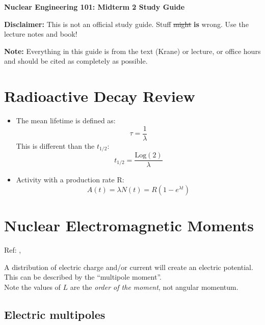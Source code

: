 \documentclass[letter]{article}
\begin{document}
\textbf{\Large{Nuclear Engineering 101: Midterm 2 Study Guide}} \\
\vspace{12pt}

\textbf{Disclaimer:} This is not an official study guide. Stuff \sout{might}
\textbf{is} wrong. Use the lecture notes and book!
\vspace{10pt}

\textbf{Note:} Everything in this guide is from the text (Krane) or
lecture, or office hours and should be cited as completely as
possible.

\tableofcontents

\section{Radioactive Decay Review}

\begin{itemize}
\item The mean lifetime is defined as:
  \begin{equation*}
    \tau = \frac{1}{\lambda}
  \end{equation*}
This is different than the $t_{1/2}$:
\begin{equation*}
  t_{1/2}=\frac{\text{Log}(2)}{\lambda}
\end{equation*}
\item Activity with a production rate R:
  \begin{equation*}
    A(t)=\lambda{}N(t)=R(1-e^{\lambda{}t})
  \end{equation*}
\end{itemize}

\section{Nuclear Electromagnetic Moments}

Ref: \cite[pp. 71-75]{krane},\cite[Lec 10]{lecture}

A distribution of electric charge and/or current will create an
electric potential. This can be described by the ``multipole
moment''. \\

Note the values of $L$ are the \textit{order of the moment}, not
angular momentum.

\subsection{Electric multipoles}
\end{document}
